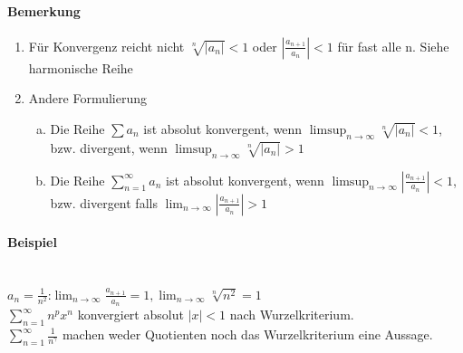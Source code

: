 \documentclass[fleqn]{scrbook}
\begin{document}
\paragraph{Bemerkung}
\begin{enumerate}[1)]
\item Für Konvergenz reicht nicht $\sqrt[n]{|a_n|} < 1$ oder $|\frac{a_{n+1}}{a_n}| < 1$ für fast alle n. Siehe harmonische Reihe
\item Andere Formulierung\\
\begin{enumerate}[a)]
\item Die Reihe $\sum a_n$ ist absolut konvergent, wenn $\limsup_{n\rightarrow\infty} \sqrt[n]{|a_n|} < 1$, bzw. divergent, wenn $\limsup_{n\rightarrow\infty} \sqrt[n]{|a_n|} > 1$
\item Die Reihe $\sum_{n=1}^\infty a_n$ ist absolut konvergent, wenn $\limsup_{n\rightarrow\infty} |\frac{a_{n+1}}{a_n}| < 1$, bzw. divergent falls $\lim_{n\rightarrow\infty} |\frac{a_{n+1}}{a_n}| > 1$
\end{enumerate}
\end{enumerate}
\paragraph{Beispiel}$ $\\
$a_n = \frac{1}{n^2}$:$\lim_{n\rightarrow\infty} \frac{a_{n+1}}{a_n} = 1, \lim_{n\rightarrow\infty} \sqrt[n]{n^2} = 1$\\
$\sum_{n=1}^\infty n^px^n$ konvergiert absolut $|x|<1$ nach Wurzelkriterium.\\
$\sum_{n=1}^\infty \frac{1}{n^\gamma}$ machen weder Quotienten noch das Wurzelkriterium eine Aussage.
\end{document}
